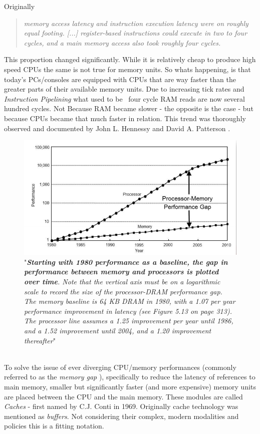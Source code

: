 Originally
\begin{quote}
	\textit{memory access latency and instruction execution latency were on roughly equal footing. [...] register-based instructions could execute in two to four cycles, and a main memory access also took roughly four cycles.}
\end{quote}
This proportion changed significantly. While it is relatively cheap to produce high speed CPUs the same is not true for memory units. So whats happening, is that today's PCs/consoles are equipped with CPUs that are way faster than the greater parts of their available memory units. Due to increasing tick rates and \textit{Instruction Pipelining} what used to be ~four cycle RAM reads are now several hundred cycles. Not Because RAM became slower - the opposite is the case - but because CPUs became that much faster in relation.
This trend was thoroughly observed and documented by John L. Hennessy and David A. Patterson .\\
\begin{figure}[!htbp]
	\centering
	\includegraphics[width=0.7\linewidth]{PICs/cpu_memory_gap}
	\caption{"\textit{\textbf{Starting with 1980 performance as a baseline, the gap in performance
			between memory and processors is plotted over time}.
			Note that the vertical axis
			must be on a logarithmic scale to record the size of the processor-DRAM performance
			gap. The memory baseline is 64 KB DRAM in 1980, with a 1.07 per year performance
			improvement in latency (see Figure 5.13 on page 313). The processor line assumes a
			1.25 improvement per year until 1986, and a 1.52 improvement until 2004, and a 1.20
			improvement thereafter}" }\label{cpu_memory_gap}
\end{figure}\\
To solve the issue of ever diverging CPU/memory performances (commonly referred to as the \textit{memory gap }), specifically to reduce the latency of references to main memory, smaller but significantly faster (and more expensive) memory units are placed between the CPU and the main memory. These modules are called \textit{Caches} - first named by C.J. Conti  in 1969. Originally cache technology was mentioned as \textit{buffers}. Not considering their complex, modern modalities and policies this is a fitting notation.\\

